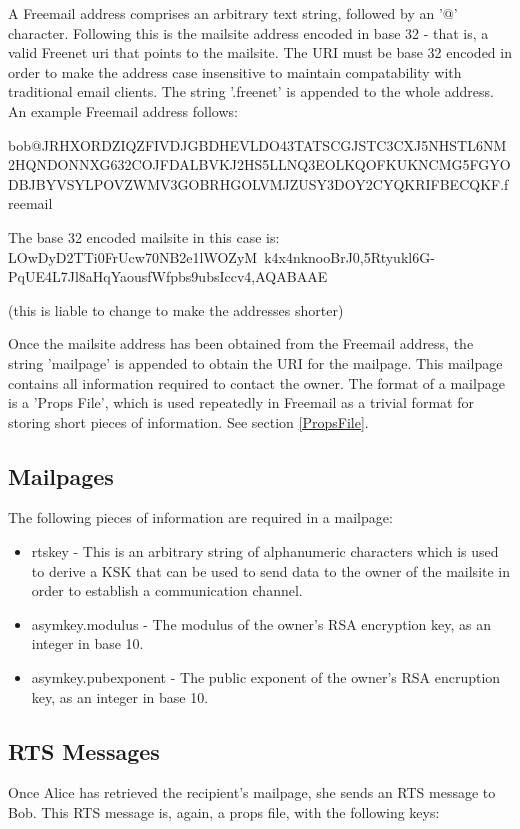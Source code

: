 \documentclass[12pt,a4paper]{article}
\begin{document}
A Freemail address comprises an arbitrary text string, followed by an '@' character. Following this is the mailsite address encoded in base 32 - that is, a valid Freenet uri that points to the mailsite. The URI must be base 32 encoded in order to make the address case insensitive to maintain compatability with traditional email clients. The string '.freenet' is appended to the whole address. An example Freemail address follows:

bob@JRHXORDZIQZFIVDJ\-GBDHEVLDO43TATSCGJST\-C3CXJ5NHSTL6NM2HQ\-NDONNXG632COJFD\-ALBVKJ2HS5LLNQ3E\-OLKQOFKUKNCMG5F\-GYODBJBYVSYLPOVZ\-WMV3GOBRHGOLVMJ\-ZUSY3DOY2CY\-QKRIFBECQKF.freemail

The base 32 encoded mailsite in this case is: LOwDyD2TTi0FrUcw70N\-B2e1lWOZyM~k4x4n\-knooBrJ0,5Rtyu\-kl6G-PqUE4L7\-Jl8aHqYaous\-fWfpbs9ubsI\-ccv4,AQABAAE

(this is liable to change to make the addresses shorter)

Once the mailsite address has been obtained from the Freemail address, the string 'mailpage' is appended to obtain the URI for the mailpage. This mailpage contains all information required to contact the owner. The format of a mailpage is a 'Props File', which is used repeatedly in Freemail as a trivial format for storing short pieces of information. See section \ref{PropsFile}.

\subsection{Mailpages}
The following pieces of information are required in a mailpage:

\begin{itemize}
\item rtskey - This is an arbitrary string of alphanumeric characters which is used to derive a KSK that can be used to send data to the owner of the mailsite in order to establish a communication channel.
\item asymkey.modulus - The modulus of the owner's RSA encryption key, as an integer in base 10.
\item asymkey.pubexponent - The public exponent of the owner's RSA encruption key, as an integer in base 10.
\end{itemize}

\subsection{RTS Messages}
Once Alice has retrieved the recipient's mailpage, she sends an RTS message to Bob. This RTS message is, again, a props file, with the following keys:
\end{document}
